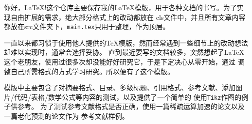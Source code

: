你好，\LaTeX!这个仓库主要保存我的\LaTeX 模版，用于各种文档的书写。为了实现自由扩展的需求，绝大部分格式上的改动都放在
cls文件中，并且所有文章内容都放在src文件夹下，\texttt{main.tex}只用于整理，作为顶层。

一直以来都习惯于使用他人提供的\TeX 模版，然而经常遇到一些细节上的改动想法却难以实现时，通常会选择妥协。
直到最近要写的文档较多，突然想起了\LaTeX 这个老朋友，使用过很多次却没能好好研究它，于是下定决心从零开始，通过
调整自己所需格式的方式学习研究。所以便有了这个模版。

模版中主要包含了对摘要格式、目录、多级标题、引用格式、参考文献、添加图片/代码/表格/数学公式等内容的测试，以及提供了一个简单的
使用\texttt{Tikz}作图的例子供参考。
为了测试参考文献格式是否正确，使用一篇稀疏运算加速的论文以及一篇老化预测的论文作为
参考文献样例。